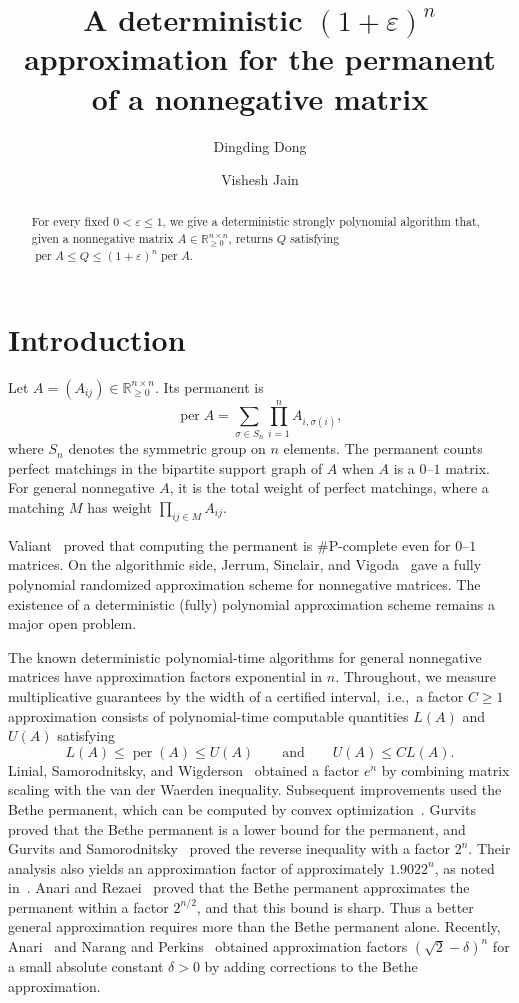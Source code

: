\documentclass[11pt,reqno,letterpaper]{amsart}
\title{A deterministic $(1+\varepsilon)^n$ approximation for the permanent of a nonnegative matrix}
\author{Dingding Dong}
\author{Vishesh Jain}
\numberwithin{equation}{section}
\theoremstyle{definition}
\theoremstyle{remark}
\newcommand{\on}{\operatorname}
\newcommand{\R}{\mathbb R}
\DeclareMathOperator{\per}{per}
\begin{document}
\begin{abstract}
For every fixed $0<\varepsilon\le1$, we give a deterministic
strongly polynomial algorithm that, given a nonnegative matrix
$A\in\R_{\ge0}^{n\times n}$, returns $Q$ satisfying
$\per A\le Q\le(1+\varepsilon)^n\per A$.
\end{abstract}

\maketitle


\section{Introduction}

Let $A=(A_{ij})\in\R_{\ge0}^{n\times n}$. Its permanent is
\[
 \per A=\sum_{\sigma\in S_n}\prod_{i=1}^n A_{i,\sigma(i)},
\]
where $S_n$ denotes the symmetric group on $n$ elements.
The permanent counts perfect matchings in the bipartite support graph of $A$ when $A$ is a $0$--$1$
matrix. For general nonnegative $A$, it is the total weight of perfect
matchings, where a matching
$M$ has weight $\prod_{ij\in M}A_{ij}$.

Valiant~\cite{Valiant} proved that computing the permanent is
$\#\mathrm P$-complete even for $0$--$1$ matrices. On the algorithmic side, Jerrum, Sinclair, and Vigoda~\cite{JSV} gave
a fully polynomial randomized approximation scheme for
nonnegative matrices. The existence of a deterministic (fully) polynomial
approximation scheme remains a major open problem.

The known deterministic polynomial-time algorithms for general
nonnegative matrices have approximation factors exponential in $n$. Throughout, we measure multiplicative guarantees by the width of a certified interval,~i.e.,~a factor $C \geq 1$ approximation consists of polynomial-time computable
quantities $L(A)$ and $U(A)$ satisfying
\[
  L(A)\leq\on{per}(A)\leq U(A)
  \qquad\text{and}\qquad
  U(A)\leq C L(A).
\]
Linial, Samorodnitsky, and Wigderson~\cite{LSW} obtained a factor
$e^n$ by combining matrix scaling with the van der Waerden inequality.
Subsequent improvements used the Bethe permanent, which can be
computed by convex optimization~\cite{Vontobel}.
Gurvits~\cite{Gurvits} proved that the Bethe permanent is
a lower bound for the permanent, and Gurvits and
Samorodnitsky~\cite{GS} proved the reverse inequality with a
factor $2^n$. Their analysis also yields an approximation
factor of approximately $1.9022^n$, as noted
in~\cite[Footnote~3]{AR}. 
Anari and Rezaei~\cite{AR} proved that the Bethe permanent
approximates the permanent within a factor $2^{n/2}$,
and that this bound is sharp.
Thus a better general approximation requires more than the
Bethe permanent alone.
Recently, Anari~\cite{Anari} and Narang and Perkins~\cite{NP}
obtained approximation factors $(\sqrt{2}-\delta)^n$ for a small absolute constant
$\delta > 0$ by adding corrections to the Bethe approximation.
\end{document}
